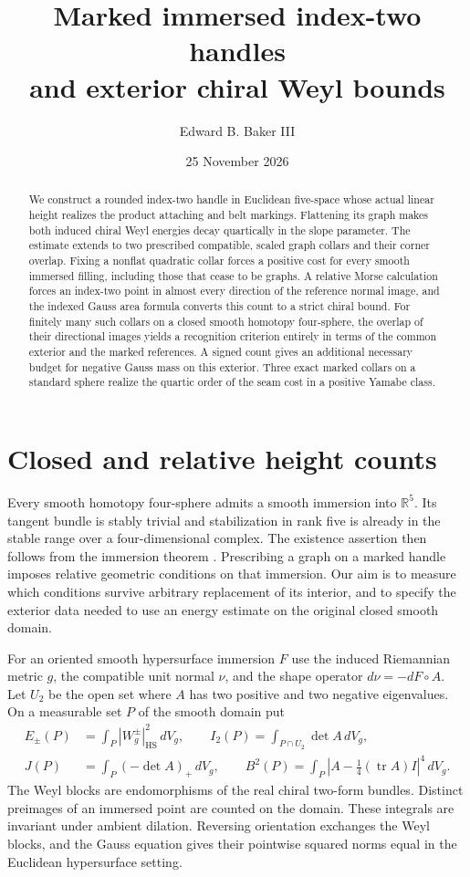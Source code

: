 \documentclass[11pt,letterpaper]{article}
\title{Marked immersed index-two handles\\and exterior chiral Weyl bounds}
\author{Edward B. Baker III}
\date{25 November 2026}
\numberwithin{equation}{section}
\theoremstyle{definition}
\begin{document}
\maketitle
\begin{abstract}
We construct a rounded index-two handle in Euclidean five-space whose
actual linear height realizes the product attaching and belt markings.
Flattening its graph makes both induced chiral Weyl energies decay
quartically in the slope parameter. The estimate extends to two
prescribed compatible, scaled graph collars and their corner overlap.
Fixing a nonflat quadratic collar forces a positive cost for every
smooth immersed filling, including those that cease to be graphs.
A relative Morse calculation forces an index-two point in almost every
direction of the reference normal image, and the indexed Gauss area
formula converts this count to a strict chiral bound. For finitely many
such collars on a closed smooth homotopy four-sphere, the overlap
of their directional images yields a recognition criterion entirely
in terms of the common exterior and the marked references. A signed
count gives an additional necessary budget for negative Gauss mass
on this exterior. Three exact marked collars on a standard sphere
realize the quartic order of the seam cost in a positive Yamabe class.
\end{abstract}

\section{Closed and relative height counts}

Every smooth homotopy four-sphere admits a smooth immersion into
\(\mathbb R^5\). Its tangent bundle is stably trivial and stabilization
in rank five is already in the stable range over a four-dimensional
complex. The existence assertion then follows from the immersion
theorem \cite[Theorem 3.1]{KervaireMilnor1963Groups}
\cite[\S6]{Hirsch1959Immersions}. Prescribing a graph on a marked handle
imposes relative geometric conditions on that immersion. Our aim is to
measure which conditions survive arbitrary replacement of its interior,
and to specify the exterior data needed to use an energy estimate on
the original closed smooth domain.

For an oriented smooth hypersurface immersion \(F\) use the induced
Riemannian metric \(g\), the compatible unit normal \(\nu\), and the
shape operator \(d\nu=-dF\circ A\). Let \(U_2\) be the open set where
\(A\) has two positive and two negative eigenvalues. On a measurable
set \(P\) of the smooth domain put
\[
 \begin{split}
 E_\pm(P)&=\int_P |W_g^\pm|_{\mathrm{HS}}^2\,dV_g,\qquad
 I_2(P)=\int_{P\cap U_2}\det A\,dV_g,\\
 J(P)&=\int_P(-\det A)_+\,dV_g,\qquad
 B^2(P)=\int_P|A-\tfrac14(\operatorname{tr}A)I|^4\,dV_g .
 \end{split}
\]
The Weyl blocks are endomorphisms of the real chiral two-form
bundles. Distinct preimages of an immersed point are counted on the
domain. These integrals are invariant under ambient dilation.
Reversing orientation exchanges the Weyl blocks, and the Gauss
equation gives their pointwise squared norms equal in the Euclidean
hypersurface setting.
\end{document}
